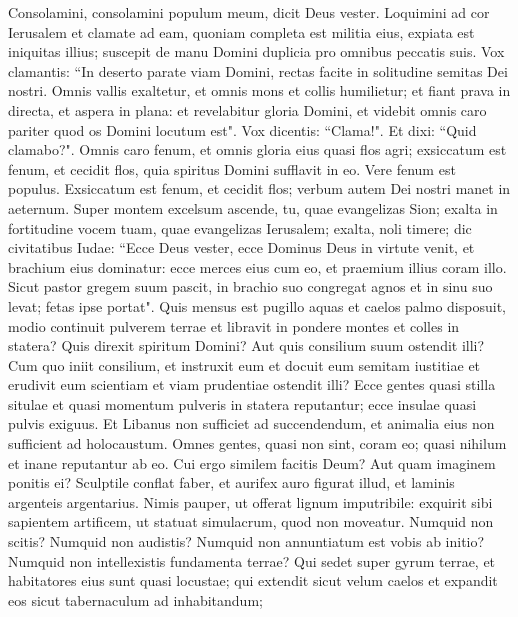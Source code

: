\begin{biblechapter}  
\verse Consolamini, consolamini populum meum, dicit Deus vester. 
\verse Loquimini ad cor Ierusalem et clamate ad eam, quoniam completa est militia eius, expiata est iniquitas illius; suscepit de manu Domini duplicia pro omnibus peccatis suis. 
\verse Vox clamantis: “In deserto parate viam Domini, rectas facite in solitudine semitas Dei nostri. 
\verse Omnis vallis exaltetur, et omnis mons et collis humilietur; et fiant prava in directa, et aspera in plana: 
\verse et revelabitur gloria Domini, et videbit omnis caro pariter quod os Domini locutum est". 
\verse Vox dicentis: “Clama!". Et dixi: “Quid clamabo?". Omnis caro fenum, et omnis gloria eius quasi flos agri; 
\verse exsiccatum est fenum, et cecidit flos, quia spiritus Domini sufflavit in eo. Vere fenum est populus. 
\verse Exsiccatum est fenum, et cecidit flos; verbum autem Dei nostri manet in aeternum. 
\verse Super montem excelsum ascende, tu, quae evangelizas Sion; exalta in fortitudine vocem tuam, quae evangelizas Ierusalem; exalta, noli timere; dic civitatibus Iudae: “Ecce Deus vester, 
\verse ecce Dominus Deus in virtute venit, et brachium eius dominatur: ecce merces eius cum eo, et praemium illius coram illo. 
\verse Sicut pastor gregem suum pascit, in brachio suo congregat agnos et in sinu suo levat; fetas ipse portat". 
\verse Quis mensus est pugillo aquas et caelos palmo disposuit, modio continuit pulverem terrae et libravit in pondere montes et colles in statera? 
\verse Quis direxit spiritum Domini? Aut quis consilium suum ostendit illi? 
\verse Cum quo iniit consilium, et instruxit eum et docuit eum semitam iustitiae et erudivit eum scientiam et viam prudentiae ostendit illi? 
\verse Ecce gentes quasi stilla situlae et quasi momentum pulveris in statera reputantur; ecce insulae quasi pulvis exiguus. 
\verse Et Libanus non sufficiet ad succendendum, et animalia eius non sufficient ad holocaustum. 
\verse Omnes gentes, quasi non sint, coram eo; quasi nihilum et inane reputantur ab eo. 
\verse Cui ergo similem facitis Deum? Aut quam imaginem ponitis ei? 
\verse Sculptile conflat faber, et aurifex auro figurat illud, et laminis argenteis argentarius. 
\verse Nimis pauper, ut offerat lignum imputribile: exquirit sibi sapientem artificem, ut statuat simulacrum, quod non moveatur. 
\verse Numquid non scitis? Numquid non audistis? Numquid non annuntiatum est vobis ab initio? Numquid non intellexistis fundamenta terrae? 
\verse Qui sedet super gyrum terrae, et habitatores eius sunt quasi locustae; qui extendit sicut velum caelos et expandit eos sicut tabernaculum ad inhabitandum; 

\end{biblechapter}

